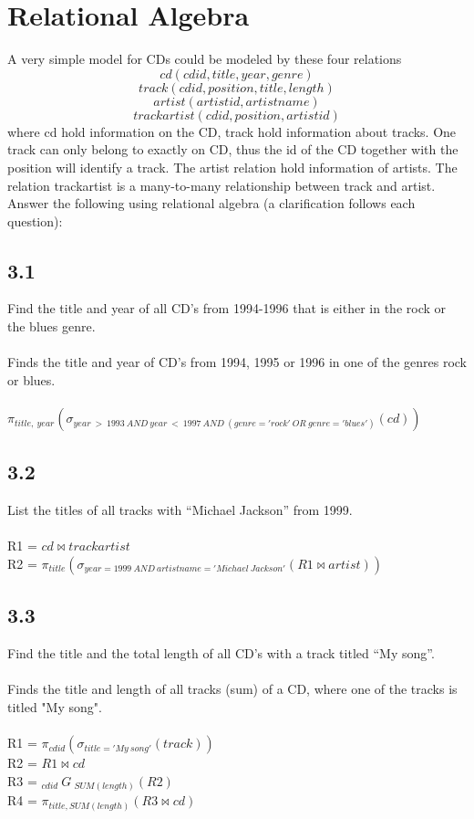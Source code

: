 \documentclass[12pt]{article}
\begin{document}
\section*{Relational Algebra}
A very simple model for CDs could be modeled by these four relations
$$cd(cdid, title, year, genre)$$
$$track(cdid, position, title, length)$$
$$artist(artistid, artistname)$$
$$trackartist(cdid, position, artistid)$$
where cd hold information on the CD, track hold information about tracks. One track can only belong to exactly on CD, thus the id of the CD together with the position will identify a track. The artist relation hold information of artists. The relation trackartist is a many-to-many relationship between track and artist.
Answer the following using relational algebra (a clarification follows each question):
\subsection*{3.1}
Find the title and year of all CD’s from 1994-1996 that is either in the rock or the blues genre.\\
\\
Finds the title and year of CD's from 1994, 1995 or 1996 in one of the genres rock or blues.\\
\\
$\pi_{title,\:year}(\sigma_{year\:>\:1993\:AND\:year\:<\:1997\:AND\:(genre='rock'\:OR\:genre='blues')}(cd))$

\subsection*{3.2}
List the titles of all tracks with “Michael Jackson” from 1999.\\
\\
R1 = $cd\Join trackartist$\\
R2 = $\pi_{title}(\sigma_{year=1999\:AND\:artistname='Michael\:Jackson'}(R1\Join artist))$

\subsection*{3.3}
Find the title and the total length of all CD’s with a track titled “My song”.\\
\\
Finds the title and length of all tracks (sum) of a CD, where one of the tracks is titled "My song".\\
\\
R1 = $\pi_{cdid}(\sigma_{title='My\:song'}(track))$\\
R2 = $R1\Join cd$\\
R3 = $_{cdid}\:G\:_{SUM(length)}(R2)$\\
R4 = $\pi_{title, SUM(length)}(R3\Join cd)$
\end{document}
